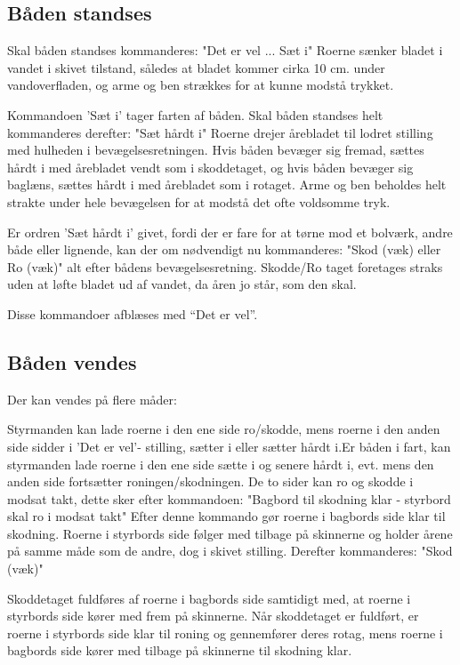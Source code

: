 \documentclass{article}
\begin{document}
\subsection{Båden standses}

Skal båden standses kommanderes: "Det er vel ... Sæt i" Roerne sænker
bladet i vandet i skivet tilstand, således at bladet kommer cirka 10 cm.
under vandoverfladen, og arme og ben strækkes for at kunne modstå
trykket.

Kommandoen ’Sæt i’ tager farten af båden. Skal båden standses helt
kommanderes derefter: "Sæt hårdt i" Roerne drejer årebladet til lodret
stilling med hulheden i bevægelsesretningen. Hvis båden bevæger sig
fremad, sættes hårdt i med årebladet vendt som i skoddetaget, og hvis
båden bevæger sig baglæns, sættes hårdt i med årebladet som i rotaget.
Arme og ben beholdes helt strakte under hele bevægelsen for at modstå det
ofte voldsomme tryk.

Er ordren ’Sæt hårdt i’ givet, fordi der er fare for at tørne mod et
bolværk, andre både eller lignende, kan der om nødvendigt nu kommanderes:
"Skod (væk) eller Ro (væk)" alt efter bådens bevægelsesretning. Skodde/Ro
taget foretages straks uden at løfte bladet ud af vandet, da åren jo
står, som den skal.

Disse kommandoer afblæses med “Det er vel”.

\subsection{Båden vendes}

Der kan vendes på flere måder:

Styrmanden kan lade roerne i den ene side ro/skodde, mens roerne i den
anden side sidder i ’Det er vel’- stilling, sætter i eller sætter hårdt
i.Er båden i fart, kan styrmanden lade roerne i den ene side sætte i og
senere hårdt i, evt. mens den anden side fortsætter roningen/skodningen.
De to sider kan ro og skodde i modsat takt, dette sker efter kommandoen:
"Bagbord til skodning klar - styrbord skal ro i modsat takt" Efter denne
kommando gør roerne i bagbords side klar til skodning. Roerne i styrbords
side følger med tilbage på skinnerne og holder årene på samme måde som de
andre, dog i skivet stilling. Derefter kommanderes: "Skod (væk)"

Skoddetaget fuldføres af roerne i bagbords side samtidigt med, at roerne
i styrbords side kører med frem på skinnerne. Når skoddetaget er
fuldført, er roerne i styrbords side klar til roning og gennemfører deres
rotag, mens roerne i bagbords side kører med tilbage på skinnerne til
skodning klar.
\end{document}
